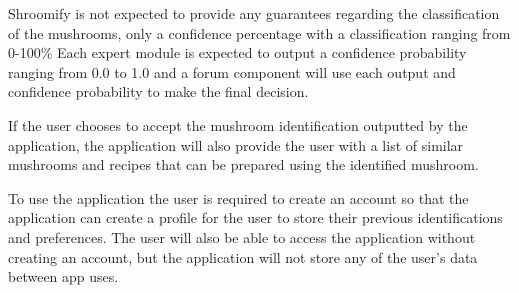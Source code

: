 \documentclass{article}
\begin{document}
Shroomify is not expected to provide any guarantees regarding the classification of the mushrooms, only a confidence percentage with a classification ranging from 0-100\%
Each expert module is expected to output a confidence probability ranging from 0.0 to 1.0 and a forum component will use each output and confidence probability to make the final decision.

If the user chooses to accept the mushroom identification outputted by the application, the application will also provide the user with a list of similar mushrooms and recipes that can be prepared using the identified mushroom.

To use the application the user is required to create an account so that the application can create a profile for the user to store their previous identifications and preferences. The user will also be able to access the application without creating an account, but the application will not store any of the user's data between app uses.
\clearpage
\end{document}
